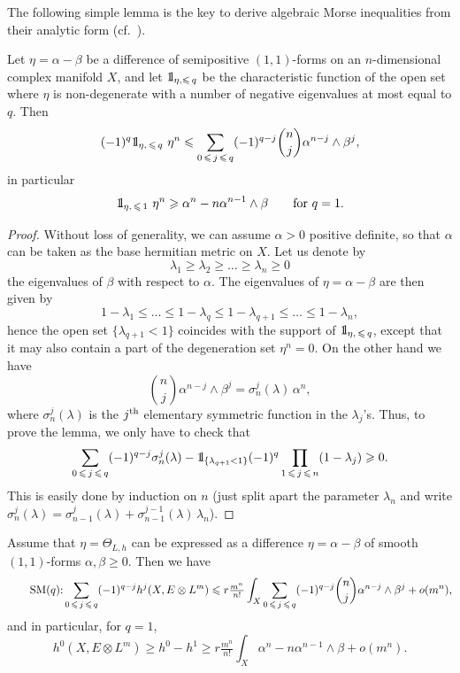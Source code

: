 \documentclass[AHL,Unicode,longabstracts,published]{cedram}
\DeclareMathOperator{\SM}{SM}
\newcommand*\bOne{{\mathchoice {\rm 1\mskip-4mu l} {\rm 1\mskip-4mu l} {\rm 1\mskip-4.5mu l}{\rm 1\mskip-5mu l}}}
\let\leq\leqslant
\let\geq\geqslant
\begin{document}
The following simple lemma is the key to derive algebraic Morse inequalities from their analytic form (cf.~\cite[Theorem~12.3]{Dem94}).
\begin{lemm}\label{lemm:forms_ineq}
Let $\eta=\alpha-\beta$ be a difference of semipositive
$(1,1)$-forms on an $n$-dimensional complex manifold $X$, and let $\bOne_{\eta,\leq\,q}$ be the characteristic function of the open set where $\eta$ is non-degenerate with a number of negative eigenvalues at most equal to $q$. Then
\[
(-1)^q\bOne_{\eta,\,\leq\,q}~\eta^n\leq \sum_{0\,\leq\,j\,\leq\,q}(-1)^{q-j}
\binom{n}{ j}\alpha^{n-j}\wedge\beta^j,
\]
in particular
\[
\bOne_{\eta,\,\leq\,1}~\eta^n\geq \alpha^n-n\alpha^{n-1}\wedge \beta\qquad\text{for $q=1$.}
\]
\end{lemm}

\begin{proof}
Without loss of generality, we can assume $\alpha>0$ positive definite, so that
$\alpha$ can be taken as the base hermitian metric on $X$. Let us denote by
\[
\lambda_1\geq\lambda_2\geq\ldots\geq\lambda_n\geq 0
\]
the eigenvalues of $\beta$ with respect to $\alpha$. The eigenvalues of $\eta=\alpha-\beta$ are then given by
\[
1-\lambda_1\leq\ldots\leq 1-\lambda_q\leq 1-\lambda_{q+1}\leq\ldots\leq 1-\lambda_n,
\]
hence the open set $\{\lambda_{q+1}<1\}$ coincides with the support of
$\bOne_{\eta,\,\leq\,q}$, except that it may also contain a part of the degeneration set $\eta^n=0$. On the other hand we have
\[
\binom{n}{ j}\alpha^{n-j}\wedge\beta^j =
\sigma_n^j(\lambda)\,\alpha^n,
\]
where $\sigma_n^j(\lambda)$ is the $j^{\rm th}$ elementary symmetric function in the $\lambda_j$'s. Thus, to prove the lemma, we only have to check that
\[
\sum_{0\,\leq\,j\,\leq\,q}(-1)^{q-j}\sigma_n^j(\lambda)-
\bOne_{\left\{\lambda_{q+1}<1\right\}}(-1)^q\prod_{1\,\leq\,j\,\leq\,n}(1-\lambda_j)\geq 0.
\]
This is easily done by induction on $n$ (just split apart the parameter
$\lambda_n$ and write
$\sigma_n^j(\lambda) =
\sigma_{n-1}^j(\lambda)+\sigma_{n-1}^{j-1}(\lambda)\,\lambda_n
$).
\end{proof}

\begin{coro}\label{coro:Morse}
Assume that $\eta=\Theta_{L,h}$ can be expressed as a difference $\eta=\alpha-\beta$ of smooth $(1,1)$-forms $\alpha,\beta\geq 0$. Then we have
\[
\tag*{$\SM(q)$:}
\sum_{0\,\leq\,j\,\leq\,q} (-1)^{q-j}h^j(X,E\otimes L^m) \leq r \tfrac{m^n}{ n!}
\int_X\sum_{0\,\leq\,j\,\leq\,q}(-1)^{q-j}\binom{n}{ j}\alpha^{n-j}\wedge\beta^j+o(m^n),
\]
and in particular, for $q=1$,
\[
h^0(X,E\otimes L^m)\geq h^0-h^1\ge r\tfrac{m^n}{ n!}\int_X\alpha^n-n\alpha^{n-1}\wedge\beta+o(m^n).
\]
\end{coro}
\end{document}
